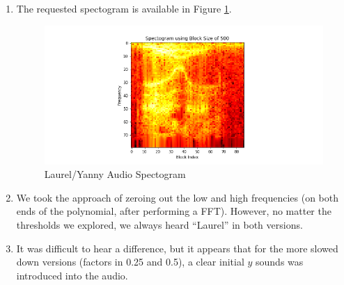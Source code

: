 \documentclass[12pt]{article}
\begin{document}
\begin{enumerate}[label=(\alph*)]
  \item The requested spectogram is available in Figure \ref{fig:spectogram}.
    \begin{figure}[!ht]
      \centering
      \includegraphics[scale=0.8]{figures/spectogram.png}
      \caption{Laurel/Yanny Audio Spectogram}
      \label{fig:spectogram}
    \end{figure}
  \item
    We took the approach of zeroing out the low and high frequencies (on both ends of the polynomial, after performing a FFT). However, no matter the thresholds we explored, we always heard ``Laurel'' in both versions.

  \item
    It was difficult to hear a difference, but it appears that for the more slowed down versions (factors in 0.25 and 0.5), a clear initial $y$ sounds was introduced into the audio.

\end{enumerate}




\newpage

\end{document}
